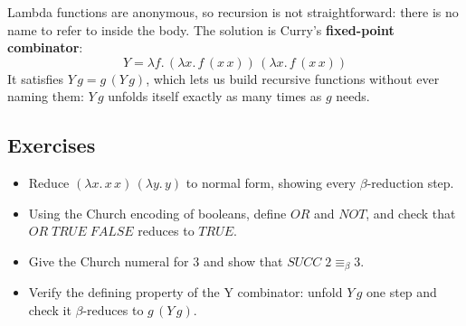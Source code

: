 Lambda functions are anonymous, so recursion is not straightforward: there is
no name to refer to inside the body. The solution is Curry's
\textbf{fixed-point combinator}:
\[
  Y = \lambda f.\,(\lambda x.\, f\,(x\, x))\,(\lambda x.\, f\,(x\, x))
\]
It satisfies $Y\, g = g\,(Y\, g)$, which lets us build recursive functions
without ever naming them: $Y\,g$ unfolds itself exactly as many times as $g$
needs.

\subsection{Exercises}
\begin{itemize}
  \item Reduce $(\lambda x.\, x\, x)\,(\lambda y.\, y)$ to normal form,
  showing every $\beta$-reduction step.
  \item Using the Church encoding of booleans, define $\mathit{OR}$ and
  $\mathit{NOT}$, and check that $\mathit{OR}\;\mathit{TRUE}\;\mathit{FALSE}$
  reduces to $\mathit{TRUE}$.
  \item Give the Church numeral for $3$ and show that
  $\mathit{SUCC}\;2 \equiv_\beta 3$.
  \item Verify the defining property of the Y combinator: unfold
  $Y\,g$ one step and check it $\beta$-reduces to $g\,(Y\,g)$.
\end{itemize}